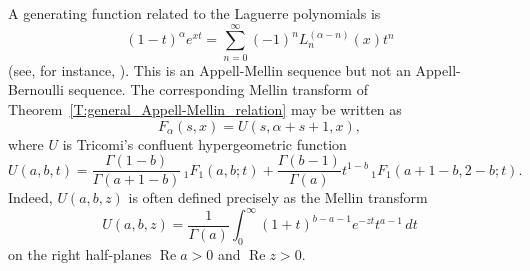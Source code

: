 \documentclass[11pt,a4paper]{amsart}
\renewcommand{\Re}{\operatorname{Re}}
\theoremstyle{plain}
\theoremstyle{plain}
\theoremstyle{definition}
\theoremstyle{remark}
\begin{document}
A generating function related to the Laguerre polynomials is
\[
	(1-t)^{\alpha} e^{xt} = \sum_{n=0}^{\infty} (-1)^{n} L_{n}^{(\alpha - n)}(x) t^{n}
\]
(see, for instance, \cite[p.~242 in Section 5.5.2]{MOS}). 
This is an Appell-Mellin sequence but not an Appell-Bernoulli sequence.
The corresponding Mellin transform of Theorem~\ref{T:general_Appell-Mellin_relation} may be written as 
\[
	F_{\alpha}(s,x) = U(s,\alpha +s+1,x),
\]
where $U$ is Tricomi's confluent hypergeometric function
\[
	  U(a,b,t)
	 =  \frac{\Gamma(1-b)}{\Gamma(a+1-b)} \, {}_{1}F_{1}(a,b;t)
	  + \frac{\Gamma(b-1)}{\Gamma(a)} t^{1-b} \, {}_{1}F_{1}(a+1-b,2-b;t).
\]
Indeed, $U(a,b,z)$ is often defined precisely as the Mellin transform
\[
	U(a,b,z) = \frac{1}{\Gamma(a)} \int_{0}^{\infty} (1 + t)^{b - a - 1} e^{-zt} t^{a-1} \, dt
\]
on the right half-planes $\Re a > 0$ and $\Re z > 0$.
\end{document}
